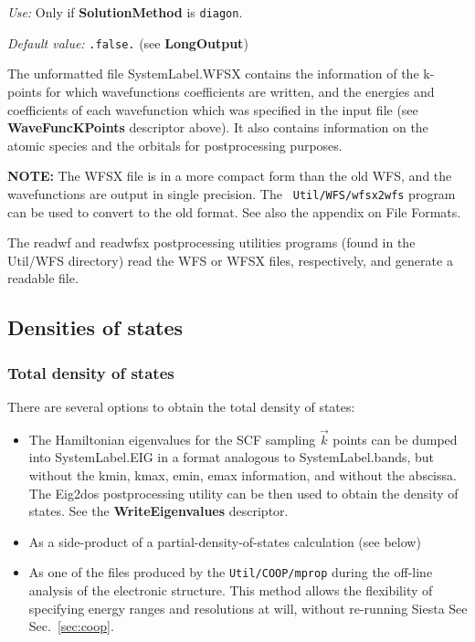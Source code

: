 \documentclass[11pt]{article}
\begin{document}
\begin{description}
{\it Use:} Only if {\bf SolutionMethod} is {\tt diagon}.
 
{\it Default value:} {\tt .false.} (see {\bf LongOutput})


\end{description}

The unformatted file SystemLabel.WFSX contains the information of the
k-points for which wavefunctions coefficients are written, and the
energies and coefficients of each wavefunction which was specified in
the input file (see {\bf WaveFuncKPoints} descriptor above). It also contains information
on the atomic species and the orbitals for postprocessing purposes.

{\bf NOTE:} The WFSX file is in a more compact form than the old WFS,
and the wavefunctions are output in single precision. The {\tt
  Util/WFS/wfsx2wfs} program can be used to convert to the old format.
See also the appendix on File Formats.

\noindent
The readwf and readwfsx postprocessing
utilities programs (found in the Util/WFS directory) read the WFS or WFSX
files, respectively, and generate a readable file.


\vspace{5pt}
\subsection{Densities of states}

\subsubsection{Total density of states}
There are several options to obtain the 
total density of states:
\begin{itemize}
\item The Hamiltonian eigenvalues for the SCF sampling $\vec k$ points can be
dumped into SystemLabel.EIG in a format analogous to SystemLabel.bands,
but without the kmin, kmax, emin, emax information, and without
the abscissa. The {\sc Eig2dos}
postprocessing utility can be then used to obtain the density of
states. 
See the {\bf WriteEigenvalues} descriptor.
%
\item As a side-product of a partial-density-of-states calculation
  (see below)
\item As one of the files produced by the {\tt Util/COOP/mprop} during
  the off-line analysis of the electronic structure. This method
  allows the flexibility of specifying energy ranges and resolutions
  at will, without re-running {\sc Siesta} See Sec.~\ref{sec:coop}.
\end{itemize}
\end{document}
